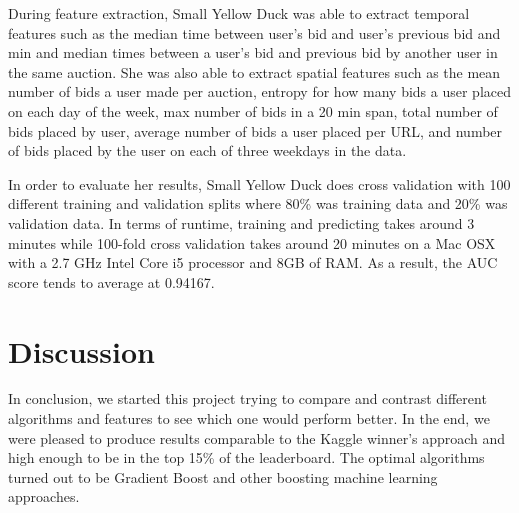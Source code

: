 \documentclass{article} %
\begin{document}
\begin{figure}[h]
\centering
{}
\end{figure}

During feature extraction, Small Yellow Duck was able to extract temporal features such as the median time between user's bid and user's previous bid and min and median times between a user's bid and previous bid by another user in the same auction. She was also able to extract spatial features such as the mean number of bids a user made per auction, entropy for how many bids a user placed on each day of the week, max number of bids in a 20 min span, total number of bids placed by user, average number of bids a user placed per URL, and number of bids placed by the user on each of three weekdays in the data.

In order to evaluate her results, Small Yellow Duck does cross validation with 100 different training and validation splits where 80\% was training data and 20\% was validation data.
In terms of runtime, training and predicting takes around 3 minutes while 100-fold cross validation takes around 20 minutes on a Mac OSX with a 2.7 GHz Intel Core i5 processor and 8GB of RAM.
As a result, the AUC score tends to average at 0.94167. 

\section{Discussion}
In conclusion, we started this project trying to compare and contrast different algorithms and features to see which one would perform better. In the end, we were pleased to produce results comparable to the Kaggle winner's approach and high enough to be in the top 15\% of the leaderboard. The optimal algorithms turned out to be Gradient Boost and other boosting machine learning approaches. \\
\end{document}
